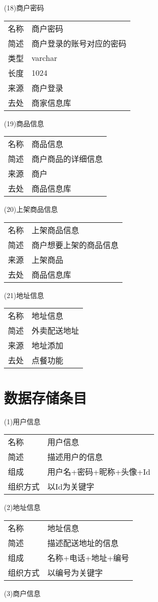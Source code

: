 (18)商户密码

\begin{longtable}[]{@{}ll@{}}
\toprule
名称 & 商户密码\tabularnewline
简述 & 商户登录的账号对应的密码\tabularnewline
类型 & varchar\tabularnewline
长度 & 1024\tabularnewline
来源 & 商户登录\tabularnewline
去处 & 商家信息库\tabularnewline
\bottomrule
\end{longtable}

(19)商品信息

\begin{longtable}[]{@{}ll@{}}
\toprule
名称 & 商品信息\tabularnewline
简述 & 商户商品的详细信息\tabularnewline
来源 & 商户\tabularnewline
去处 & 商品信息库\tabularnewline
\bottomrule
\end{longtable}

(20)上架商品信息

\begin{longtable}[]{@{}ll@{}}
\toprule
名称 & 上架商品信息\tabularnewline
简述 & 商户想要上架的商品信息\tabularnewline
来源 & 上架商品\tabularnewline
去处 & 商品信息库\tabularnewline
\bottomrule
\end{longtable}

(21)地址信息

\begin{longtable}[]{@{}ll@{}}
\toprule
名称 & 地址信息\tabularnewline
简述 & 外卖配送地址\tabularnewline
来源 & 地址添加\tabularnewline
去处 & 点餐功能\tabularnewline
\bottomrule
\end{longtable}

\section{数据存储条目}

(1)用户信息

\begin{longtable}[]{@{}ll@{}}
\toprule
名称 & 用户信息\tabularnewline
简述 & 描述用户的信息\tabularnewline
组成 & 用户名+密码+昵称+头像+Id\tabularnewline
组织方式 & 以Id为关键字\tabularnewline
\bottomrule
\end{longtable}

(2)地址信息

\begin{longtable}[]{@{}ll@{}}
\toprule
名称 & 地址信息\tabularnewline
简述 & 描述配送地址的信息\tabularnewline
组成 & 名称+电话+地址+编号\tabularnewline
组织方式 & 以编号为关键字\tabularnewline
\bottomrule
\end{longtable}

(3)商户信息

